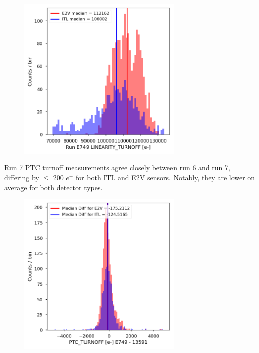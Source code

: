 \begin{figure}[H]
\begin{centering}
\includegraphics[width=0.7\textwidth]{figures/baselineCharacterization/LINEARITY_TURNOFF_E749_sensorType.png}
\end{centering}
\end{figure}

Run 7 PTC turnoff measurements agree closely between run 6 and run 7, differing by $\leq$ 200 $e^-$ for both ITL and E2V sensors. Notably, they are lower on average for both detector types.

\begin{figure}[H]
\begin{centering}
\includegraphics[width=0.7\textwidth]{figures/baselineCharacterization/PTC_TURNOFF_13591_E749_diff.png}
\end{centering}
\end{figure}

